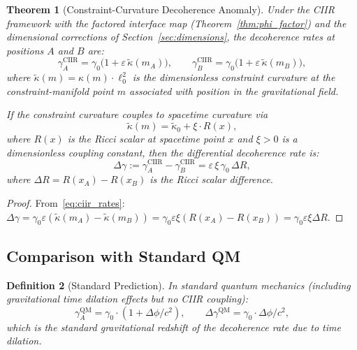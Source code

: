 \documentclass[11pt,a4paper]{article}
\newtheorem{definition}{Definition}[section]
\newtheorem{theorem}[definition]{Theorem}
\theoremstyle{remark}
\begin{document}
\begin{theorem}[Constraint-Curvature Decoherence Anomaly]
\label{thm:prediction}
Under the CIIR framework with the factored interface map
(Theorem~\ref{thm:phi_factor}) and the dimensional corrections of
Section~\ref{sec:dimensions}, the decoherence rates at positions
$A$ and $B$ are:
\begin{equation}
\label{eq:ciir_rates}
  \gamma_A^{\mathrm{CIIR}} =
    \gamma_0 \bigl(1 + \varepsilon \, \tilde{\kappa}(m_A)\bigr),
  \qquad
  \gamma_B^{\mathrm{CIIR}} =
    \gamma_0 \bigl(1 + \varepsilon \, \tilde{\kappa}(m_B)\bigr),
\end{equation}
where $\tilde{\kappa}(m) = \kappa(m) \cdot \ell_0^2$ is the
dimensionless constraint curvature at the constraint-manifold point
$m$ associated with position in the gravitational field.

If the constraint curvature couples to spacetime curvature via
\begin{equation}
\label{eq:kappa_gravity}
  \tilde{\kappa}(m) = \tilde{\kappa}_0 + \xi \cdot R(x),
\end{equation}
where $R(x)$ is the Ricci scalar at spacetime point $x$ and
$\xi > 0$ is a dimensionless coupling constant, then the
\emph{differential decoherence rate} is:
\begin{equation}
\label{eq:delta_gamma}
  \boxed{
    \Delta\gamma
    := \gamma_A^{\mathrm{CIIR}} - \gamma_B^{\mathrm{CIIR}}
    = \varepsilon \, \xi \, \gamma_0 \, \Delta R,
  }
\end{equation}
where $\Delta R = R(x_A) - R(x_B)$ is the Ricci scalar difference.
\end{theorem}

\begin{proof}
From~\eqref{eq:ciir_rates}:
$\Delta\gamma
= \gamma_0 \varepsilon (\tilde{\kappa}(m_A) - \tilde{\kappa}(m_B))
= \gamma_0 \varepsilon \xi (R(x_A) - R(x_B))
= \gamma_0 \varepsilon \xi \Delta R$.
\end{proof}

\subsection{Comparison with Standard QM}

\begin{definition}[Standard Prediction]
\label{def:qm_prediction}
In standard quantum mechanics (including gravitational time dilation
effects but no CIIR coupling):
\begin{equation}
  \gamma_A^{\mathrm{QM}} = \gamma_0 \cdot (1 + \Delta\phi / c^2),
  \qquad
  \Delta\gamma^{\mathrm{QM}} = \gamma_0 \cdot \Delta\phi / c^2,
\end{equation}
which is the standard gravitational redshift of the decoherence rate
due to time dilation.
\end{definition}
\end{document}
